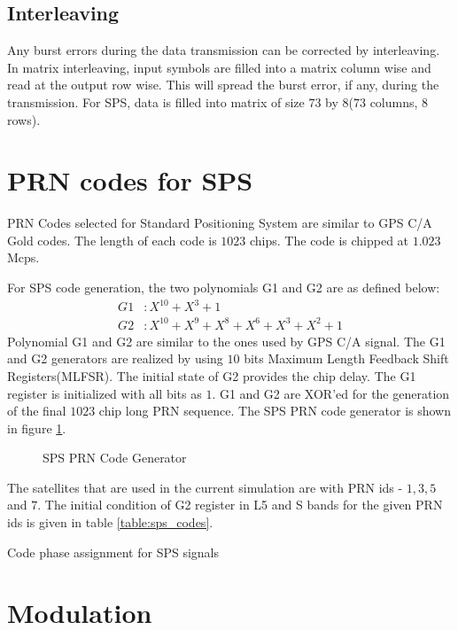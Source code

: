 \subsection{Interleaving}
Any burst errors during the data transmission can be corrected by interleaving. In matrix interleaving, input symbols are filled into a matrix column wise and read at the output row wise. This will spread the burst error, if any, during the transmission. For SPS, data is filled into matrix of size $73$ by $8$($73$ columns, $8$ rows).

\section{PRN codes for SPS}
PRN Codes selected for Standard Positioning System are similar to GPS C/A Gold codes. The length of each code is $1023$ chips. The code is chipped at $1.023$ Mcps.

\noindent For SPS code generation, the two polynomials G1 and G2 are as defined below:
\begin{align}
G1 &: X^{10}+X^{3} + 1\\
G2 &: X^{10}+X^9+X^8+X^6+X^3+X^2+1
\end{align}
Polynomial G1 and G2 are similar to the ones used by GPS C/A signal. The G1 and G2 generators are realized by using $10$ bits Maximum Length Feedback Shift Registers(MLFSR). The initial state of G2 provides the chip delay. The G1 register is initialized with all bits as $1$. G1 and G2 are XOR'ed for the generation of the final $1023$ chip long PRN sequence. The SPS PRN code generator is shown in figure \ref{figure:codeGen}.

\begin{figure}[!ht]
	\centering
	
	\caption{SPS PRN Code Generator}
	\label{figure:codeGen}
\end{figure}

\noindent The satellites that are used in the current simulation are with PRN ids - $1,3,5$ and $7$. The initial condition of G2 register in L5 and S bands for the given PRN ids is given in table \ref{table:sps_codes}.

\begin{table}[h]

\vspace{3mm}
\caption{Code phase assignment for SPS signals}
\label{table:sps_codes}
\end{table}

\section{Modulation}

